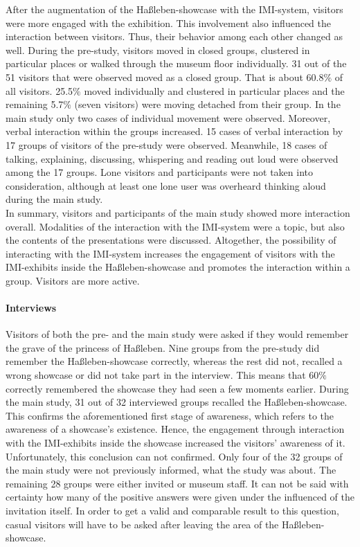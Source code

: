 After the augmentation of the Haßleben-showcase with the \ac{IMI}-system, visitors were more engaged with the exhibition. This involvement also influenced the interaction between visitors. Thus, their behavior among each other changed as well. During the pre-study, visitors moved in closed groups, clustered in particular places or walked through the museum floor individually. 31 out of the 51 visitors that were observed moved as a closed group. That is about 60.8$\%$ of all visitors. 25.5$\%$ moved individually and clustered in particular places and the remaining 5.7$\%$ (seven visitors) were moving detached from their group. In the main study only two cases of individual movement were observed. Moreover, verbal interaction within the groups increased. 15 cases of verbal interaction by 17 groups of visitors of the pre-study were observed. Meanwhile, 18 cases of talking, explaining, discussing, whispering and reading out loud were observed among the 17 groups. Lone visitors and participants were not taken into consideration, although at least one lone user was overheard thinking aloud during the main study.
\\
In summary, visitors and participants of the main study showed more interaction overall. Modalities of the interaction with the \ac{IMI}-system were a topic, but also the contents of the presentations were discussed. Altogether, the possibility of interacting with the \ac{IMI}-system increases the engagement of visitors with the \ac{IMI}-exhibits inside the Haßleben-showcase and promotes the interaction within a group. Visitors are more active. 


\paragraph{Interviews} Visitors of both the pre- and the main study were asked if they would remember the grave of the princess of Haßleben. Nine groups from the pre-study did remember the Haßleben-showcase correctly, whereas the rest did not, recalled a wrong showcase or did not take part in the interview. This means that 60$\%$ correctly remembered the showcase they had seen a few moments earlier. During the main study, 31 out of 32 interviewed groups recalled the Haßleben-showcase. This confirms the aforementioned first stage of awareness, which refers to the awareness of a showcase's existence. Hence, the engagement through interaction with the \ac{IMI}-exhibits inside the showcase increased the visitors' awareness of it. 
\\
Unfortunately, this conclusion can not confirmed. Only four of the 32 groups of the main study were not previously informed, what the study was about. The remaining 28 groups were either invited or museum staff. It can not be said with certainty how many of the positive answers were given under the influenced of the invitation itself. In order to get a valid and comparable result to this question, casual visitors will have to be asked after leaving the area of the Haßleben-showcase.

